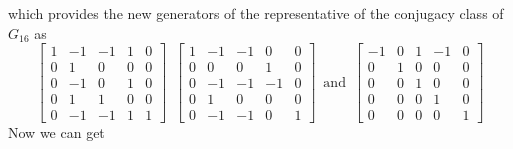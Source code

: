 \documentclass{article}
\theoremstyle{plain}
\theoremstyle{definition}
\newcommand{\tand}{\ensuremath{\,\,\, \text{and} \,\,\,}}
\begin{document}
which provides the new generators of the representative of the conjugacy class of $G_{16}$ as
$$
\left[ \begin {array}{cccc|c} 1&-1&-1&1&0\\  0&1&0&0&0
\\  0&-1&0&1&0\\  0&1&1&0&0
\\ \hline 0&-1&-1&1&1\end {array} \right] 
\,\,\,
 \left[ \begin {array}{cccc|c} 1&-1&-1&0&0\\  0&0&0&1&0
\\  0&-1&-1&-1&0\\  0&1&0&0&0
\\ \hline 0&-1&-1&0&1\end {array} \right] 
\tand
 \left[ \begin {array}{cccc|c} -1&0&1&-1&0\\  0&1&0&0&0
\\  0&0&1&0&0\\  0&0&0&1&0
\\ \hline 0&0&0&0&1\end {array} \right] 
$$
Now we can get 
\end{document}
